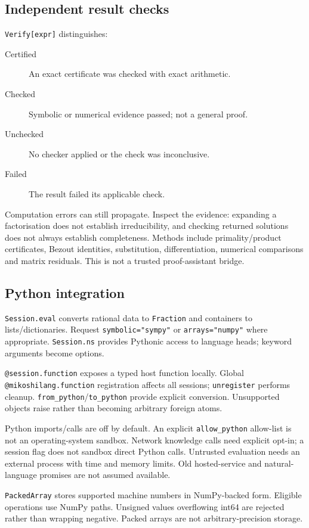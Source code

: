 \documentclass[11pt,a4paper]{article}
\begin{document}
\subsection{Independent result checks}
\texttt{Verify[expr]} distinguishes:
\begin{description}
\item[Certified] An exact certificate was checked with exact arithmetic.
\item[Checked] Symbolic or numerical evidence passed; not a general proof.
\item[Unchecked] No checker applied or the check was inconclusive.
\item[Failed] The result failed its applicable check.
\end{description}
Computation errors can still propagate. Inspect the evidence: expanding a factorisation does not establish irreducibility, and checking returned solutions does not always establish completeness. Methods include primality/product certificates, Bezout identities, substitution, differentiation, numerical comparisons and matrix residuals. This is not a trusted proof-assistant bridge.

\subsection{Python integration}
\texttt{Session.eval} converts rational data to \texttt{Fraction} and containers to lists/dictionaries. Request \texttt{symbolic="sympy"} or \texttt{arrays="numpy"} where appropriate. \texttt{Session.ns} provides Pythonic access to language heads; keyword arguments become options.

\texttt{@session.function} exposes a typed host function locally. Global \texttt{@mikoshilang.function} registration affects all sessions; \texttt{unregister} performs cleanup. \texttt{from\_python}/\texttt{to\_python} provide explicit conversion. Unsupported objects raise rather than becoming arbitrary foreign atoms.

Python imports/calls are off by default. An explicit \texttt{allow\_python} allow-list is not an operating-system sandbox. Network knowledge calls need explicit opt-in; a session flag does not sandbox direct Python calls. Untrusted evaluation needs an external process with time and memory limits. Old hosted-service and natural-language promises are not assumed available.

\texttt{PackedArray} stores supported machine numbers in NumPy-backed form. Eligible operations use NumPy paths. Unsigned values overflowing int64 are rejected rather than wrapping negative. Packed arrays are not arbitrary-precision storage.
\end{document}
